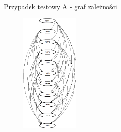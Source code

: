 \documentclass{beamer}
\begin{document}
\begin{frame}{Przypadek testowy A - graf zależności}
\begin{figure}[H]
	\begin{center}
  		\includegraphics[height=6cm]{TestA.png}
	\end{center}
\end{figure}
\end{frame}
\end{document}
